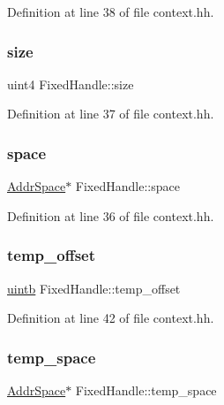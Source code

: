 Definition at line 38 of file context.\+hh.

\mbox{\label{struct_fixed_handle_aea689738eae3a5efef95baa06e147cb9}} 
\subsubsection{\texorpdfstring{size}{size}}
{\footnotesize\ttfamily uint4 Fixed\+Handle\+::size}



Definition at line 37 of file context.\+hh.

\mbox{\label{struct_fixed_handle_a586744314e01538098e1cb2bfbc501da}} 
\subsubsection{\texorpdfstring{space}{space}}
{\footnotesize\ttfamily \mbox{\hyperlink{class_addr_space}{Addr\+Space}}$\ast$ Fixed\+Handle\+::space}



Definition at line 36 of file context.\+hh.

\mbox{\label{struct_fixed_handle_a5ff9452b3c33b06ac8c9fe7c85b76496}} 
\subsubsection{\texorpdfstring{temp\_offset}{temp\_offset}}
{\footnotesize\ttfamily \mbox{\hyperlink{types_8h_a2db313c5d32a12b01d26ac9b3bca178f}{uintb}} Fixed\+Handle\+::temp\+\_\+offset}



Definition at line 42 of file context.\+hh.

\mbox{\label{struct_fixed_handle_ac599fe9a8fe7b919e1ea86398289d17c}} 
\subsubsection{\texorpdfstring{temp\_space}{temp\_space}}
{\footnotesize\ttfamily \mbox{\hyperlink{class_addr_space}{Addr\+Space}}$\ast$ Fixed\+Handle\+::temp\+\_\+space}



